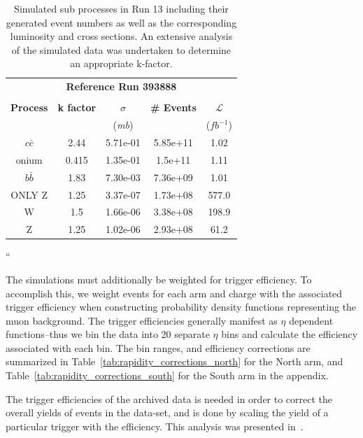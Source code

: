 \begin{table}[ht]
  \centering
  \begin{tabular}{ccccc}
    \toprule
    \multicolumn{5}{c}{\textbf{Reference Run 393888}}\\ 
     & & & & \\
    \textbf{Process} & 
    \textbf{k factor} & 
    \textbf{$\sigma$ } & 
    \textbf{\# Events} & 
    \textbf{ $\mathcal{L}$ } \\
    & & (\textit{mb}) &  & ($fb^{-1}$) \\
    \midrule
    $c\bar{c}$ & 2.44  & 5.71e-01 & 5.85e+11 & 1.02 \\
    onium      & 0.415 & 1.35e-01 &  1.5e+11 & 1.11 \\
    $b\bar{b}$ & 1.83  & 7.30e-03 & 7.36e+09 & 1.01 \\
    ONLY Z     & 1.25  & 3.37e-07 & 1.73e+08 & 577.0\\
    W          & 1.5   & 1.66e-06 & 3.38e+08 & 198.9\\
    Z          & 1.25  & 1.02e-06 & 2.93e+08 & 61.2 \\
    \bottomrule
  \end{tabular}
  \caption{
    Simulated sub processes in Run 13 including their generated event numbers as
    well as the corresponding luminosity and cross sections.  An extensive
    analysis of the simulated data was undertaken to determine an appropriate
    k-factor. 
  }
  \label{tab:simulation_cross_sections}
\end{table}                  
``

The simulations must additionally be weighted for trigger efficiency. To
accomplish this, we weight events for each arm and charge with the associated
trigger efficiency when constructing probability density functions representing
the muon background. The trigger efficiencies generally manifest as $\eta$
dependent functions--thus we bin the data into 20 separate $\eta$ bins and
calculate the efficiency associated with each bin. The bin ranges, and
efficiency corrections are summarized in
Table~\ref{tab:rapidity_corrections_north} for the North arm, and
Table~\ref{tab:rapidity_corrections_south} for the South arm in the appendix.

The trigger efficiencies of the archived data is needed in order to correct the
overall yields of events in the data-set, and is done by scaling the yield of a
particular trigger with the efficiency. This analysis was presented
in~\cite{Seidl2014a}.

